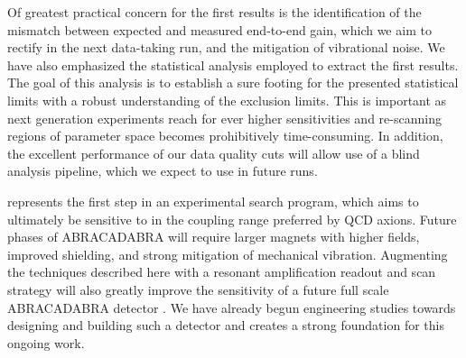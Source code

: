 \documentclass[aps,prd,amsmath,amssymb,reprint,superscriptaddress, nofootinbib,
]{revtex4-1}
\begin{document}
Of greatest practical concern for the first results is the identification of the mismatch between expected and measured end-to-end gain, which we aim to rectify in the next data-taking run, and the mitigation of vibrational noise. We have also emphasized the statistical analysis employed to extract the first results. The goal of this analysis is to establish a sure footing for the presented statistical limits with a robust understanding of the exclusion limits. This is important as next generation experiments reach for ever higher sensitivities and re-scanning regions of parameter space becomes prohibitively time-consuming. In addition, the excellent performance of our data quality cuts will allow use of a blind analysis pipeline, which we expect to use in future runs.

\abra represents the first step in an experimental search program, which aims to ultimately be sensitive to \ADM in the coupling range preferred by QCD axions. Future phases of ABRACADABRA will require larger magnets with higher fields, improved shielding, and strong mitigation of mechanical vibration. Augmenting the techniques described here with a resonant amplification readout and scan strategy will also greatly improve the sensitivity of a future full scale ABRACADABRA detector \cite{ABRA2016,DMRadio_Design,Chaudhuri:2018rqn}. We have already begun engineering studies towards designing and building such a detector and \abra creates a strong foundation for this ongoing work.


 
\end{document}
